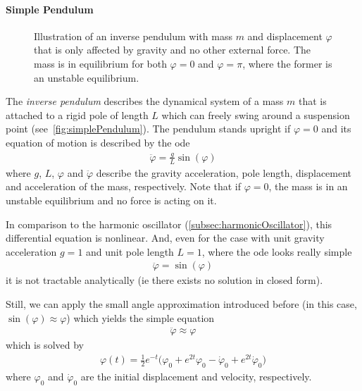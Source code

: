 		\paragraph{Simple Pendulum}
			\label{subsec:simplePendulum}

			\begin{figure}
				\centering
				\tikzSimplePendulum
				\caption{Illustration of an inverse pendulum with mass \(m\) and displacement \(\varphi\) that is only affected by gravity and no other external force. The mass is in equilibrium for both \( \varphi = 0 \) and \( \varphi = \pi \), where the former is an unstable equilibrium.}
				\label{fig:simplePendulum}
			\end{figure}

			The \emph{inverse pendulum} describes the dynamical system of a mass \(m\) that is attached to a rigid pole of length \(L\) which can freely swing around a suspension point (see~\autoref{fig:simplePendulum}). The pendulum stands upright if \( \varphi = 0 \) and its equation of motion is described by the \ac{ode}
			\begin{align*}
				\ddot{\varphi} = \frac{g}{L} \sin(\varphi)
			\end{align*}
			where \(g\), \(L\), \(\varphi\) and \(\ddot{\varphi}\) describe the gravity acceleration, pole length, displacement and acceleration of the mass, respectively. Note that if \( \varphi = 0 \), the mass is in an unstable equilibrium and no force is acting on it.

			In comparison to the harmonic oscillator (\autoref{subsec:harmonicOscillator}), this differential equation is nonlinear. And, even for the case with unit gravity acceleration \( g = 1 \) and unit pole length \( L = 1\), where the \ac{ode} looks really simple
			\begin{align}
				\ddot{\varphi} = \sin(\varphi)  \label{eq:inversePendulum}
			\end{align}
			it is not tractable analytically (\ac{ie} there exists no solution in closed form).

			Still, we can apply the small angle approximation introduced before (in this case, \( \sin(\varphi) \approx \varphi \)) which yields the simple equation
			\begin{align}
				\ddot{\varphi} \approx \varphi  \label{eq:linearizedInversePendulum}
			\end{align}
			which is solved by
			\begin{align*}
				\varphi(t) = \frac{1}{2} e^{-t} \big(\varphi_0 + e^{2t} \varphi_0 - \dot{\varphi}_0 + e^{2t} \dot{\varphi}_0\big)
			\end{align*}
			where \(\varphi_0\) and \(\dot{\varphi}_0\) are the initial displacement and velocity, respectively.

